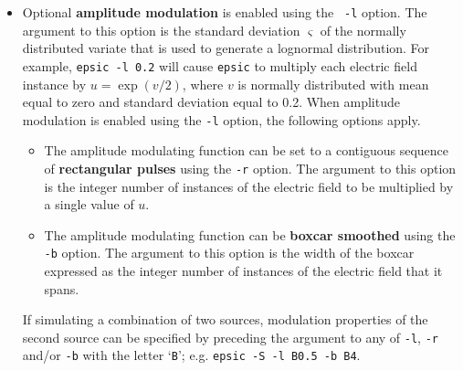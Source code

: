 \documentclass[12pt]{article}
\begin{document}
\begin{itemize}
\item Optional {\bf amplitude modulation} is enabled using the {\tt
  -l} option.  The argument to this option is the standard deviation
  $\varsigma$ of the normally distributed variate that is used to
  generate a lognormal distribution.  For example, {\tt epsic -l
    0.2} will cause {\tt epsic} to multiply each electric field
  instance by $u=\exp(v/2)$, where $v$ is normally distributed with
  mean equal to zero and standard deviation equal to 0.2.  When
  amplitude modulation is enabled using the {\tt -l} option, the
  following options apply.
  
  \begin{itemize}
  \item
    The amplitude modulating function can be set to a contiguous
    sequence of {\bf rectangular pulses} using the {\tt -r} option.  The
    argument to this option is the integer number of instances of the
    electric field to be multiplied by a single value of $u$. 
  \item
    The amplitude modulating function can be {\bf boxcar smoothed} using the
    {\tt -b} option.  The argument to this option is the width of the
    boxcar expressed as the integer number of instances of the
    electric field that it spans.
  \end{itemize}

  If simulating a combination of two sources, modulation properties of
  the second source can be specified by preceding the argument to any
  of {\tt -l}, {\tt -r} and/or {\tt -b} with the letter `{\tt B}';
  e.g. {\tt epsic -S -l B0.5 -b B4}.
  
\end{itemize}
%
\end{document}
